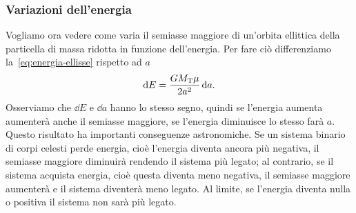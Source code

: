 {\subsubsection{Variazioni dell'energia}
\label{sec:variazioni energia}

Vogliamo ora vedere come varia il semiasse maggiore di un'orbita ellittica della
particella di massa ridotta in funzione dell'energia. Per fare ciò differenziamo
la~\eqref{eq:energia-ellisse} rispetto ad $a$
\begin{equation}
  \mathop{}\!\mathrm{d} E = \frac{GM_\textup{T}\mu}{2a^2}\mathop{}\!\mathrm{d} a.
\end{equation}
Osserviamo che $\dd E$ e $\dd a$ hanno lo stesso segno, quindi se l'energia
aumenta aumenterà anche il semiasse maggiore, se l'energia diminuisce lo stesso
farà $a$. Questo risultato ha importanti conseguenze astronomiche. Se un sistema
binario di corpi celesti perde energia, cioè l'energia diventa ancora più
negativa, il semiasse maggiore diminuirà rendendo il sistema più legato; al
contrario, se il sistema acquista energia, cioè questa diventa meno negativa, il
semiasse maggiore aumenterà e il sistema diventerà meno legato. Al limite, se
l'energia diventa nulla o positiva il sistema non sarà più legato.

}
